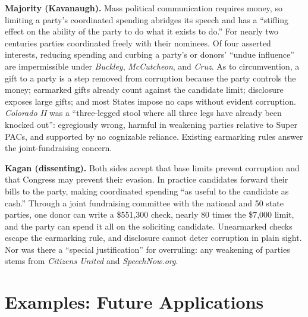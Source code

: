 \documentclass[12pt]{article}
\begin{document}
\textbf{Majority (Kavanaugh).} Mass political communication requires money, so limiting a party's coordinated spending abridges its speech and has a ``stifling effect on the ability of the party to do what it exists to do.'' For nearly two centuries parties coordinated freely with their nominees. Of four asserted interests, reducing spending and curbing a party's or donors' ``undue influence'' are impermissible under \textit{Buckley}, \textit{McCutcheon}, and \textit{Cruz}. As to circumvention, a gift to a party is a step removed from corruption because the party controls the money; earmarked gifts already count against the candidate limit; disclosure exposes large gifts; and most States impose no caps without evident corruption. \textit{Colorado II} was a ``three-legged stool where all three legs have already been knocked out'': egregiously wrong, harmful in weakening parties relative to Super PACs, and supported by no cognizable reliance. Existing earmarking rules answer the joint-fundraising concern.

\textbf{Kagan (dissenting).} Both sides accept that base limits prevent corruption and that Congress may prevent their evasion. In practice candidates forward their bills to the party, making coordinated spending ``as useful to the candidate as cash.'' Through a joint fundraising committee with the national and 50 state parties, one donor can write a \$551,300 check, nearly 80 times the \$7,000 limit, and the party can spend it all on the soliciting candidate. Unearmarked checks escape the earmarking rule, and disclosure cannot deter corruption in plain sight. Nor was there a ``special justification'' for overruling: any weakening of parties stems from \textit{Citizens United} and \textit{SpeechNow.org}.

\section{Examples: Future Applications}
\end{document}
